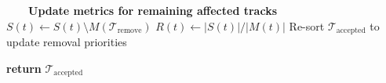 \documentclass[11pt]{article}
\begin{document}
\begin{algorithm}
\begin{algorithmic}[1]
    \Statex
    \Statex \ \ \ \ \textbf{Update metrics for remaining affected tracks}
        \State $S(t) \gets S(t) \setminus M(\mathcal{T}_{\mathrm{remove}})$
        \State $R(t) \gets |S(t)| / |M(t)|$
    \EndFor
    \State Re-sort $\mathcal{T}_{\mathrm{accepted}}$ to update removal priorities
\EndFor

\State \textbf{return} $\mathcal{T}_{\mathrm{accepted}}$

\end{algorithmic}
\end{algorithm}
\end{document}
